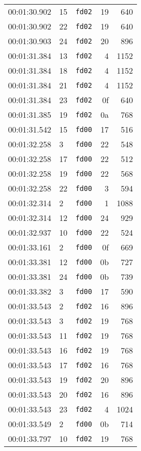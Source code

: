 \documentclass{article}
\begin{document}
\begin{longtable}{lllrr}
00:01:30.902 & 15 & \texttt{fd02} & 19 & 640 \\
00:01:30.902 & 22 & \texttt{fd02} & 19 & 640 \\
00:01:30.903 & 24 & \texttt{fd02} & 20 & 896 \\
00:01:31.384 & 13 & \texttt{fd02} & 4 & 1152 \\
00:01:31.384 & 18 & \texttt{fd02} & 4 & 1152 \\
00:01:31.384 & 21 & \texttt{fd02} & 4 & 1152 \\
00:01:31.384 & 23 & \texttt{fd02} & 0f & 640 \\
00:01:31.385 & 19 & \texttt{fd02} & 0a & 768 \\
00:01:31.542 & 15 & \texttt{fd00} & 17 & 516 \\
00:01:32.258 & 3 & \texttt{fd00} & 22 & 548 \\
00:01:32.258 & 17 & \texttt{fd00} & 22 & 512 \\
00:01:32.258 & 19 & \texttt{fd00} & 22 & 568 \\
00:01:32.258 & 22 & \texttt{fd00} & 3 & 594 \\
00:01:32.314 & 2 & \texttt{fd00} & 1 & 1088 \\
00:01:32.314 & 12 & \texttt{fd00} & 24 & 929 \\
00:01:32.937 & 10 & \texttt{fd00} & 22 & 524 \\
00:01:33.161 & 2 & \texttt{fd00} & 0f & 669 \\
00:01:33.381 & 12 & \texttt{fd00} & 0b & 727 \\
00:01:33.381 & 24 & \texttt{fd00} & 0b & 739 \\
00:01:33.382 & 3 & \texttt{fd00} & 17 & 590 \\
00:01:33.543 & 2 & \texttt{fd02} & 16 & 896 \\
00:01:33.543 & 3 & \texttt{fd02} & 19 & 768 \\
00:01:33.543 & 11 & \texttt{fd02} & 19 & 768 \\
00:01:33.543 & 16 & \texttt{fd02} & 19 & 768 \\
00:01:33.543 & 17 & \texttt{fd02} & 16 & 768 \\
00:01:33.543 & 19 & \texttt{fd02} & 20 & 896 \\
00:01:33.543 & 20 & \texttt{fd02} & 16 & 896 \\
00:01:33.543 & 23 & \texttt{fd02} & 4 & 1024 \\
00:01:33.549 & 2 & \texttt{fd00} & 0b & 714 \\
00:01:33.797 & 10 & \texttt{fd02} & 19 & 768 \\

\end{longtable}
\end{document}
